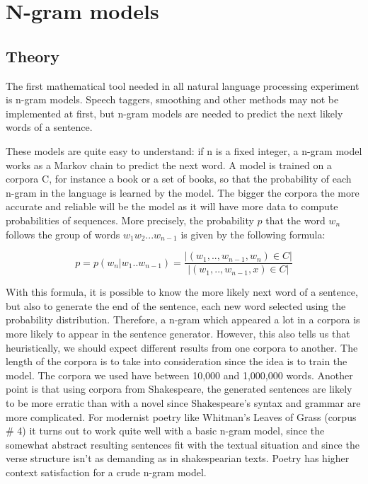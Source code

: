 \documentclass[a4paper,12pt]{article}
\begin{document}
\section{N-gram models}
\label{sec:ngram}

\subsection{Theory}
The first mathematical tool needed in all natural language processing experiment is n-gram models. Speech taggers, smoothing and other methods may not be implemented at first, but n-gram models are needed to predict the next likely words of a sentence.

These models are quite easy to understand: if n is a fixed integer, a n-gram model works as a Markov chain to predict the next word. A model is trained on a corpora C, for instance a book or a set of books, so that the probability of each n-gram in the language is learned by the model. The bigger the corpora the more accurate and reliable will be the model as it will have more data to compute probabilities of sequences. More precisely, the probability $p$ that the word $w_n$ follows the group of words $w_1 w_2 ... w_{n-1}$ is given by the following formula:

$$ p = p(w_n | w_1 .. w_{n-1}) = \frac{|{(w_1, .., w_{n-1}, w_n) \in C}|}{|{(w_1, .., w_{n-1}, x) \in C}|} $$

With this formula, it is possible to know the more likely next word of a sentence, but also to generate the end of the sentence, each new word selected using the probability distribution. Therefore, a n-gram which appeared a lot in a corpora is more likely to appear in the sentence generator. However, this also tells us that heuristically, we should expect different results from one corpora to another. The length of the corpora is to take into consideration since the idea is to train the model. The corpora we used have between 10,000 and 1,000,000 words. Another point is that using corpora from Shakespeare, the generated sentences are likely to be more erratic than with a novel since Shakespeare's syntax and grammar are more complicated. For modernist poetry like Whitman's Leaves of Grass (corpus \# 4) it turns out to work quite well with a basic n-gram model, since the somewhat abstract resulting sentences fit with the textual situation and since the verse structure isn't as demanding as in shakespearian texts. Poetry has higher context satisfaction for a crude n-gram model.
\end{document}
